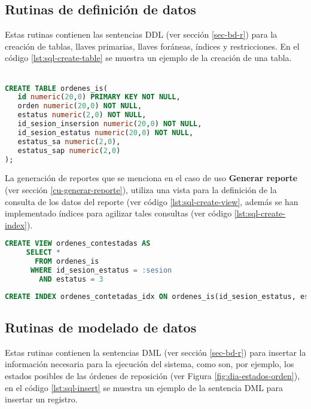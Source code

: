 \subsection{Rutinas de definición de datos}
Estas rutinas contienen las sentencias DDL (ver sección \ref{sec-bd-r}) para la creación de tablas, llaves primarias, llaves foráneas, índices y restricciones. En el código \ref{lst:sql-create-table} se muestra un ejemplo de la creación de una tabla.
\\
\\
\begin{lstlisting}[language=SQL, caption={Sentencia para crear una tabla.}, label={lst:sql-create-table}]
CREATE TABLE ordenes_is(
   id numeric(20,0) PRIMARY KEY NOT NULL,
   orden numeric(20,0) NOT NULL,
   estatus numeric(2,0) NOT NULL,
   id_sesion_insersion numeric(20,0) NOT NULL,
   id_sesion_estatus numeric(20,0) NOT NULL,
   estatus_sa numeric(2,0),
   estatus_sap numeric(2,0)
);
\end{lstlisting}

La generación de reportes que se menciona en el caso de uso \textbf{Generar reporte} (ver sección \ref{cu-generar-reporte}), utiliza una vista para la definición de la consulta de los datos del reporte (ver código \ref{lst:sql-create-view}, además se han implementado índices para agilizar tales consultas (ver código \ref{lst:sql-create-index}).

\begin{lstlisting}[language=SQL, caption={Sentencia para crear una vista.}, label={lst:sql-create-view}]
CREATE VIEW ordenes_contestadas AS
     SELECT *
       FROM ordenes_is
      WHERE id_sesion_estatus = :sesion
        AND estatus = 3
\end{lstlisting}

\begin{lstlisting}[language=SQL, caption={Sentencia para crear un índice.}, label={lst:sql-create-index}]
CREATE INDEX ordenes_contetadas_idx ON ordenes_is(id_sesion_estatus, estatus);
\end{lstlisting}

\subsection{Rutinas de modelado de datos}
Estas rutinas contienen la sentencias DML (ver sección \ref{sec-bd-r}) para insertar la información necesaria para la ejecución del sistema, como son, por ejemplo, los estados posibles de las órdenes de reposición (ver Figura \ref{fig:dia-estados-orden}), en el código \ref{lst:sql-insert} se muestra un ejemplo de la sentencia DML para insertar un registro.

